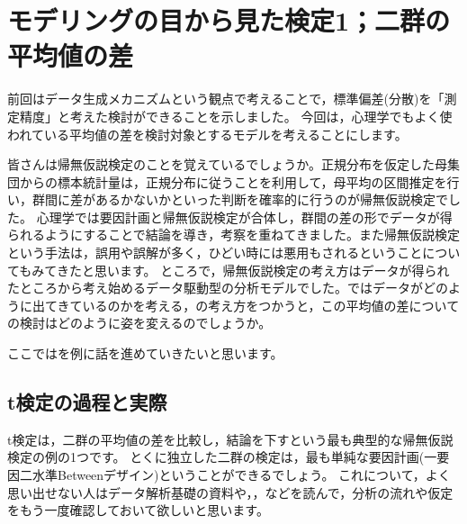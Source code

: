 \documentclass{ltjsbook}
\begin{document}
\chapter{モデリングの目から見た検定1；二群の平均値の差}
\label{x19_modeling1}
前回はデータ生成メカニズムという観点で考えることで，標準偏差(分散)を「測定精度」と考えた検討ができることを示しました。
今回は，心理学でもよく使われている平均値の差を検討対象とするモデルを考えることにします。

皆さんは帰無仮説検定のことを覚えているでしょうか。正規分布を仮定した母集団からの標本統計量は，正規分布に従うことを利用して，母平均の区間推定を行い，群間に差があるかないかといった判断を確率的に行うのが帰無仮説検定でした。
心理学では要因計画と帰無仮説検定が合体し，群間の差の形でデータが得られるようにすることで結論を導き，考察を重ねてきました。また帰無仮説検定という手法は，誤用や誤解が多く，ひどい時には悪用もされるということについてもみてきたと思います。
ところで，帰無仮説検定の考え方はデータが得られたところから考え始めるデータ駆動型の分析モデルでした。ではデータがどのように出てきているのかを考える，の考え方をつかうと，この平均値の差についての検討はどのように姿を変えるのでしょうか。

ここではを例に話を進めていきたいと思います。
\section{t検定の過程と実際}
t検定は，二群の平均値の差を比較し，結論を下すという最も典型的な帰無仮説検定の例の1つです。
とくに独立した二群の検定は，最も単純な要因計画(一要因二水準Betweenデザイン)ということができるでしょう。
これについて，よく思い出せない人はデータ解析基礎の資料や，\textcite{Yamada2004}，\textcite{Shimizu2021}などを読んで，分析の流れや仮定をもう一度確認しておいて欲しいと思います。
\end{document}
